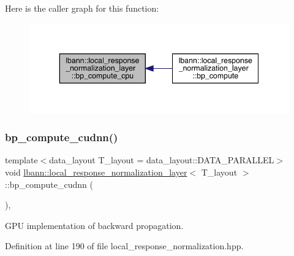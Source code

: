 Here is the caller graph for this function\+:\nopagebreak
\begin{figure}[H]
\begin{center}
\leavevmode
\includegraphics[width=343pt]{classlbann_1_1local__response__normalization__layer_a1aac4bf5e2500749bc8bafcd254f5699_icgraph}
\end{center}
\end{figure}
\mbox{\label{classlbann_1_1local__response__normalization__layer_a78b0d081956abf4f09874d59b4bf4fc8}} 
\subsubsection{\texorpdfstring{bp\+\_\+compute\+\_\+cudnn()}{bp\_compute\_cudnn()}}
{\footnotesize\ttfamily template$<$data\+\_\+layout T\+\_\+layout = data\+\_\+layout\+::\+D\+A\+T\+A\+\_\+\+P\+A\+R\+A\+L\+L\+EL$>$ \\
void \hyperlink{classlbann_1_1local__response__normalization__layer}{lbann\+::local\+\_\+response\+\_\+normalization\+\_\+layer}$<$ T\+\_\+layout $>$\+::bp\+\_\+compute\+\_\+cudnn (\begin{DoxyParamCaption}{ }\end{DoxyParamCaption})\hspace{0.3cm}{\ttfamily [inline]}, {\ttfamily [private]}}



G\+PU implementation of backward propagation. 



Definition at line 190 of file local\+\_\+response\+\_\+normalization.\+hpp.



